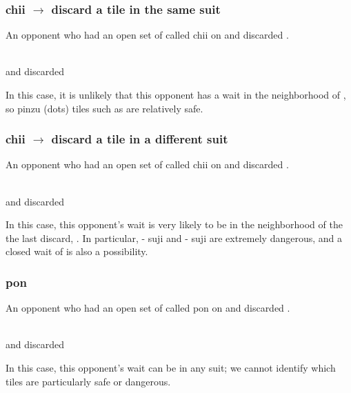 {{\subsubsection*{ {\jap chii} $\rightarrow$ discard a tile in the same suit}
An opponent who had an open set of {\LARGE\fa} called {\jap chii} on {\LARGE{}} and discarded {\LARGE{}}. 
\begin{screen}
\bp
{}
~\rfa\fa\fa\\{\normalsize and discarded} 
\ep
\end{screen}
In this case, it is unlikely that this opponent has a wait in the neighborhood of {\LARGE{}}, so {\jap pinzu} (dots) tiles such as {\LARGE{}} are relatively safe. 

\subsubsection*{ {\jap chii} $\rightarrow$ discard a tile in a different suit}
An opponent who had an open set of {\LARGE\fa} called {\jap chii} on {\LARGE{}} and discarded {\LARGE{}}. 
\begin{screen}
\bp
{}
~\rfa\fa\fa\\{\normalsize and discarded} 
\ep
\end{screen}
In this case, this opponent's wait is very likely to be in the neighborhood of the the last discard, {\LARGE{}}. In particular, {\LARGE{}-} {\jap suji} and {\LARGE{}-} {\jap suji} are extremely dangerous, and a closed wait of {\LARGE{}} is also a possibility. 

\subsubsection*{ {\jap pon}}
An opponent who had an open set of {\LARGE\fa} called {\jap pon} on {\LARGE{}} and discarded {\LARGE{}}. 
\begin{screen}
\bp
{}
~\rfa\fa\fa\\{\normalsize and discarded} 
\ep
\end{screen}
In this case, this opponent's wait can be in any suit; we cannot identify which tiles are particularly safe or dangerous. 

}}
